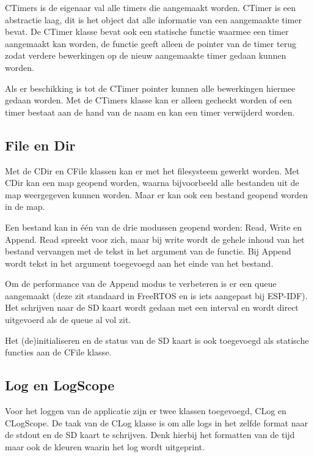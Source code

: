 \vspace{1em}
CTimers is de eigenaar val alle timers die aangemaakt worden. CTimer is een abstractie laag, dit is het object dat alle informatie van een aangemaakte timer bevat. De CTimer klasse bevat ook een statische functie waarmee een timer aangemaakt kan worden, de functie geeft alleen de pointer van de timer terug zodat verdere bewerkingen op de nieuw aangemaakte timer gedaan kunnen worden.

\vspace{1em}
Als er beschikking is tot de CTimer pointer kunnen alle bewerkingen hiermee gedaan worden. Met de CTimers klasse kan er alleen gecheckt worden of een timer bestaat aan de hand van de naam en kan een timer verwijderd worden.

\subsection{File en Dir}

Met de CDir en CFile klassen kan er met het filesysteem gewerkt worden. Met CDir kan een map geopend worden, waarna bijvoorbeeld alle bestanden uit de map weergegeven kunnen worden. Maar er kan ook een bestand geopend worden in de map.

\vspace{1em}
Een bestand kan in één van de drie modussen geopend worden: Read, Write en Append. Read spreekt voor zich, maar bij write wordt de gehele inhoud van het bestand vervangen met de tekst in het argument van de functie. Bij Append wordt tekst in het argument toegevoegd aan het einde van het bestand.

\vspace{1em}
Om de performance van de Append modus te verbeteren is er een queue aangemaakt (deze zit standaard in FreeRTOS en is iets aangepast bij ESP-IDF). Het schrijven naar de SD kaart wordt gedaan met een interval en wordt direct uitgevoerd als de queue al vol zit.

\vspace{1em}
Het (de)initialiseren en de status van de SD kaart is ook toegevoegd als statische functies aan de CFile klasse.

\subsection{Log en LogScope}

Voor het loggen van de applicatie zijn er twee klassen toegevoegd, CLog en CLogScope. De taak van de CLog klasse is om alle logs in het zelfde format naar de stdout en de SD kaart te schrijven. Denk hierbij het formatten van de tijd maar ook de kleuren waarin het log wordt uitgeprint.

